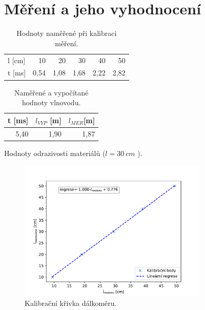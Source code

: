 \documentclass{protokol}
\begin{document}
    \maketitle

    \section{Měření a jeho vyhodnocení }

    \begin{table}[ht!]
        \caption{ Hodnoty naměřené při kalibraci měření.}
        \def\arraystretch{1.2}
        \centering
        \begin{tabular}{lrrrrr}
            \toprule
            l [cm] & 10 & 20 & 30 & 40 & 50 \\
            t [ms] & 0,54 & 1,08 & 1,68 & 2,22 & 2,82 \\
            \bottomrule
        \end{tabular}
    \end{table}

    \begin{table}[ht!]
        \caption{ Naměřené a vypočítané hodnoty vlnovodu.}
        \def\arraystretch{1.2}
        \centering
        \begin{tabular}{rrr}
            \toprule
            t [ms] & $l_{VYP}$  [\unit{{m}}] &  $l_{MER} $[\unit{{m}}] \\
            \midrule
            5,40 & 1,90 & 1,87 \\
            \bottomrule
            \end{tabular}
    \end{table}



    \begin{table}[ht!]
        \caption{Hodnoty odrazivosti materiálů (\(l=\qty{30}{cm}\) ).}
        \def\arraystretch{1.2}
        \centering
        
    \end{table}

    \begin{figure}[h!]
        \centering
        \includegraphics[width=0.8\textwidth]{img/graf2.pdf}
        \caption{Kalibrační křivka dálkoměru.}
        \label{fig:img/graf-2}
    \end{figure}
\end{document}
